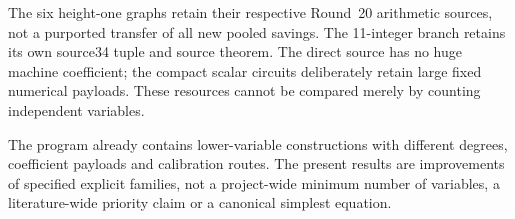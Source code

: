 The six height-one graphs retain their respective Round~20 arithmetic
sources, not a purported transfer of all new pooled savings. The
11-integer branch retains its own source34 tuple and source theorem.
The direct source has no huge machine coefficient; the compact scalar
circuits deliberately retain large fixed numerical payloads. These
resources cannot be compared merely by counting independent variables.

The program already contains lower-variable constructions with different
degrees, coefficient payloads and calibration routes. The present results
are improvements of specified explicit families, not a project-wide
minimum number of variables, a literature-wide priority claim or a
canonical simplest equation.
